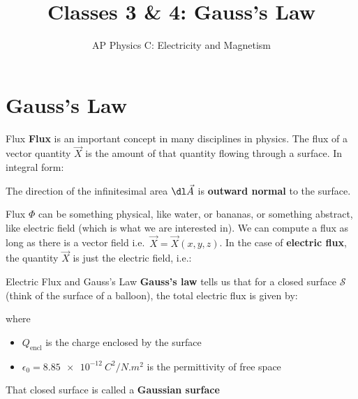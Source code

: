 \documentclass[12pt,aspectratio=169]{beamer}
\title{Classes 3 \& 4: Gauss's Law}
\subtitle{AP Physics C: Electricity and Magnetism}
\begin{document}
\begin{frame}
  \maketitle
\end{frame}


\section{Gauss's Law}

\begin{frame}{Flux}
  \textbf{Flux} is an important concept in many disciplines in physics. The
  flux of a vector quantity $\vec X$ is the amount of that quantity flowing
  through a surface. In integral form:


  The direction of the infinitesimal area $\dl\vec A$ is \textbf{outward normal}
  to the surface.
  \begin{center}
  \end{center}
\end{frame}



\begin{frame}{Flux}
  \vspace{.2in}$\Phi$ can be something physical, like water, or bananas, or
  something abstract, like electric field (which is what we are interested
  in). We can compute a flux as long as there is a vector field i.e.\
  $\vec X=\vec X(x,y,z)$. In the case of \textbf{electric flux}, the quantity
  $\vec X$ is just the electric field, i.e.:
    
  \begin{center}
  \end{center}
\end{frame}



\begin{frame}{Electric Flux and Gauss's Law}
  \textbf{Gauss's law} tells us that for a closed surface $\mathcal S$ (think
  of the surface of a balloon), the total electric flux is given by:

    
  where
  \begin{itemize}
  \item $Q_\text{encl}$ is the charge enclosed by the surface
  \item $\epsilon_0=\SI{8.85e-12}{C^2/N.m^2}$ is the permittivity of free space
  \end{itemize}
  That closed surface is called a \textbf{Gaussian surface}
\end{frame}
\end{document}
